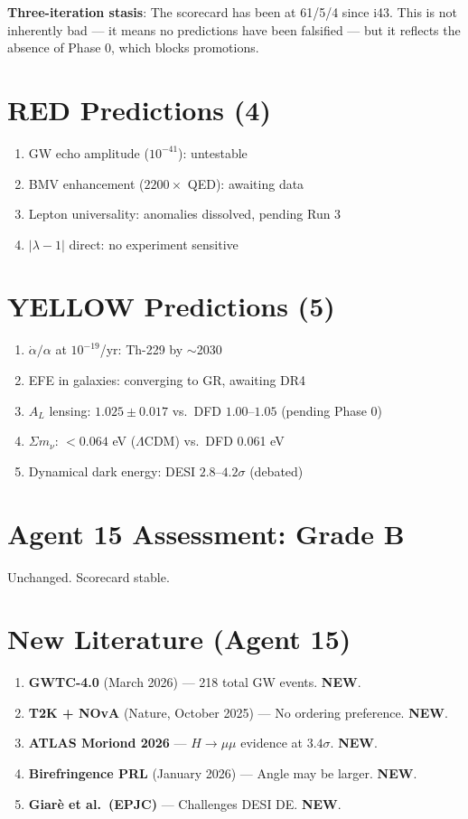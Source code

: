 \documentclass[11pt,a4paper]{article}
\newcommand{\NEW}{\textcolor{dfdblue}{\textbf{NEW}}}
\begin{document}
\textbf{Three-iteration stasis}: The scorecard has been at 61/5/4 since i43. This is not inherently bad --- it means no predictions have been falsified --- but it reflects the absence of Phase 0, which blocks promotions.

\section{RED Predictions (4)}

\begin{enumerate}
\item GW echo amplitude ($10^{-41}$): untestable
\item BMV enhancement ($2200\times$ QED): awaiting data
\item Lepton universality: anomalies dissolved, pending Run 3
\item $|\lambda-1|$ direct: no experiment sensitive
\end{enumerate}

\section{YELLOW Predictions (5)}

\begin{enumerate}
\item $\dot{\alpha}/\alpha$ at $10^{-19}$/yr: Th-229 by $\sim$2030
\item EFE in galaxies: converging to GR, awaiting DR4
\item $A_L$ lensing: $1.025 \pm 0.017$ vs.\ DFD $1.00$--$1.05$ (pending Phase 0)
\item $\Sigma m_\nu$: $< 0.064$ eV ($\Lambda$CDM) vs.\ DFD 0.061 eV
\item Dynamical dark energy: DESI $2.8$--$4.2\sigma$ (debated)
\end{enumerate}

\section{Agent 15 Assessment: Grade B}

Unchanged. Scorecard stable.

\section{New Literature (Agent 15)}

\begin{enumerate}
\item \textbf{GWTC-4.0} (March 2026) --- 218 total GW events. \NEW.
\item \textbf{T2K + NOvA} (Nature, October 2025) --- No ordering preference. \NEW.
\item \textbf{ATLAS Moriond 2026} --- $H \to \mu\mu$ evidence at $3.4\sigma$. \NEW.
\item \textbf{Birefringence PRL} (January 2026) --- Angle may be larger. \NEW.
\item \textbf{Giar\`e et al.\ (EPJC)} --- Challenges DESI DE. \NEW.
\end{enumerate}
\end{document}
